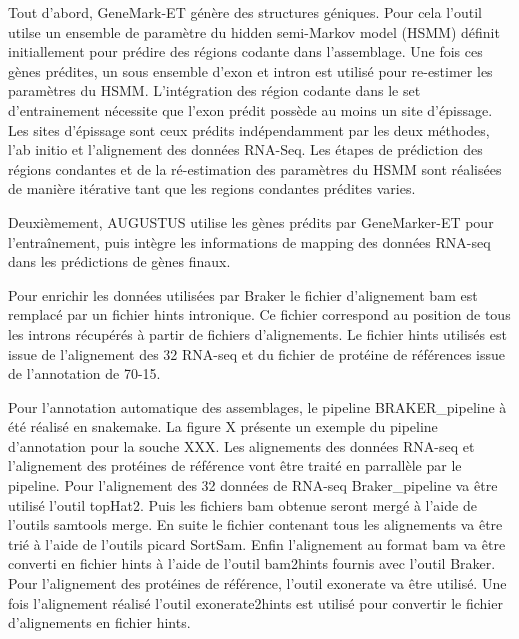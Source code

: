 \documentclass[]{article}
\begin{document}
Tout d'abord, GeneMark-ET génère des structures géniques. Pour cela
l'outil utilse un ensemble de paramètre du hidden semi-Markov model
(HSMM) définit initiallement pour prédire des régions codante dans
l'assemblage. Une fois ces gènes prédites, un sous ensemble d'exon et
intron est utilisé pour re-estimer les paramètres du HSMM. L'intégration
des région codante dans le set d'entrainement nécessite que l'exon
prédit possède au moins un site d'épissage. Les sites d'épissage sont
ceux prédits indépendamment par les deux méthodes, l'ab initio et
l'alignement des données RNA-Seq. Les étapes de prédiction des régions
condantes et de la ré-estimation des paramètres du HSMM sont réalisées
de manière itérative tant que les regions condantes prédites varies.

Deuxièmement, AUGUSTUS utilise les gènes prédits par GeneMarker-ET pour
l'entraînement, puis intègre les informations de mapping des données
RNA-seq dans les prédictions de gènes finaux.

Pour enrichir les données utilisées par Braker le fichier d'alignement
bam est remplacé par un fichier hints intronique. Ce fichier correspond
au position de tous les introns récupérés à partir de fichiers
d'alignements. Le fichier hints utilisés est issue de l'alignement des
32 RNA-seq et du fichier de protéine de références issue de l'annotation
de 70-15.

Pour l'annotation automatique des assemblages, le pipeline
BRAKER\_pipeline à été réalisé en snakemake. La figure X présente un
exemple du pipeline d'annotation pour la souche XXX. Les alignements des
données RNA-seq et l'alignement des protéines de référence vont être
traité en parrallèle par le pipeline. Pour l'alignement des 32 données
de RNA-seq Braker\_pipeline va être utilisé l'outil topHat2. Puis les
fichiers bam obtenue seront mergé à l'aide de l'outils samtools merge.
En suite le fichier contenant tous les alignements va être trié à l'aide
de l'outils picard SortSam. Enfin l'alignement au format bam va être
converti en fichier hints à l'aide de l'outil bam2hints fournis avec
l'outil Braker. Pour l'alignement des protéines de référence, l'outil
exonerate va être utilisé. Une fois l'alignement réalisé l'outil
exonerate2hints est utilisé pour convertir le fichier d'alignements en
fichier hints.
\end{document}
